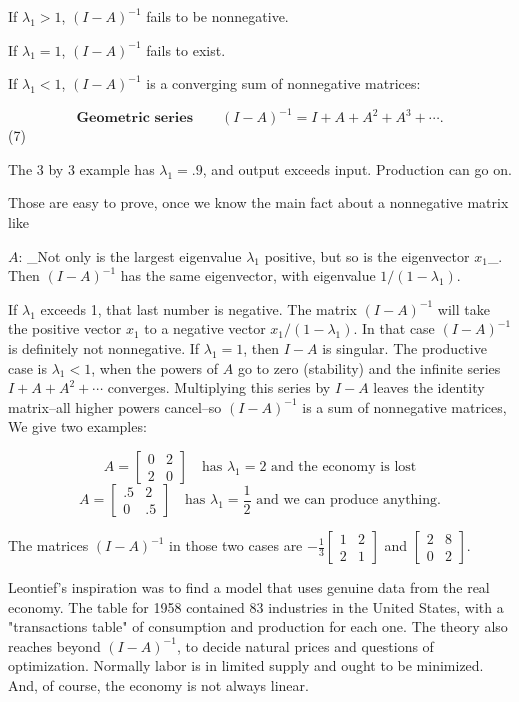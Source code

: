 If \(\lambda_{1}>1\), \((I-A)^{-1}\) fails to be nonnegative.

If \(\lambda_{1}=1\), \((I-A)^{-1}\) fails to exist.

If \(\lambda_{1}<1\), \((I-A)^{-1}\) is a converging sum of nonnegative matrices:

\[\textbf{Geometric series}\qquad(I-A)^{-1}=I+A+A^{2}+A^{3}+\cdots.\] (7)

The 3 by 3 example has \(\lambda_{1}=.9\), and output exceeds input. Production can go on.

Those are easy to prove, once we know the main fact about a nonnegative matrix like

\(A\): _Not only is the largest eigenvalue \(\lambda_{1}\) positive, but so is the eigenvector \(x_{1}\)_. Then \((I-A)^{-1}\) has the same eigenvector, with eigenvalue \(1/(1-\lambda_{1})\).

If \(\lambda_{1}\) exceeds 1, that last number is negative. The matrix \((I-A)^{-1}\) will take the positive vector \(x_{1}\) to a negative vector \(x_{1}/(1-\lambda_{1})\). In that case \((I-A)^{-1}\) is definitely not nonnegative. If \(\lambda_{1}=1\), then \(I-A\) is singular. The productive case is \(\lambda_{1}<1\), when the powers of \(A\) go to zero (stability) and the infinite series \(I+A+A^{2}+\cdots\) converges. Multiplying this series by \(I-A\) leaves the identity matrix--all higher powers cancel--so \((I-A)^{-1}\) is a sum of nonnegative matrices, We give two examples:

\[A =\begin{bmatrix}0&2\\ 2&0\end{bmatrix}\quad\text{has $\lambda_{1}=2$ and the economy is lost}\] \[A =\begin{bmatrix}.5&2\\ 0&.5\end{bmatrix}\quad\text{has $\lambda_{1}=\frac{1}{2}$ and we can produce anything.}\]

The matrices \((I-A)^{-1}\) in those two cases are \(-\frac{1}{3}\begin{bmatrix}1&2\\ 2&1\end{bmatrix}\) and \(\begin{bmatrix}2&8\\ 0&2\end{bmatrix}\).

Leontief's inspiration was to find a model that uses genuine data from the real economy. The table for 1958 contained 83 industries in the United States, with a "transactions table" of consumption and production for each one. The theory also reaches beyond \((I-A)^{-1}\), to decide natural prices and questions of optimization. Normally labor is in limited supply and ought to be minimized. And, of course, the economy is not always linear.

